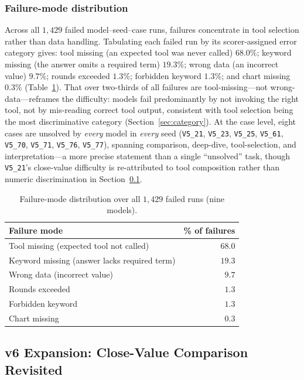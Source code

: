 \documentclass[sigconf]{acmart}
\begin{document}
\subsubsection{Failure-mode distribution}

Across all $1{,}429$ failed model--seed--case runs, failures concentrate in tool selection rather than data handling. Tabulating each failed run by its scorer-assigned error category gives: tool missing (an expected tool was never called) $68.0\%$; keyword missing (the answer omits a required term) $19.3\%$; wrong data (an incorrect value) $9.7\%$; rounds exceeded $1.3\%$; forbidden keyword $1.3\%$; and chart missing $0.3\%$ (Table~\ref{tab:failuremodes}). That over two-thirds of all failures are tool-missing---not wrong-data---reframes the difficulty: models fail predominantly by not invoking the right tool, not by mis-reading correct tool output, consistent with tool selection being the most discriminative category (Section~\ref{sec:category}). At the case level, eight cases are unsolved by \emph{every} model in \emph{every} seed (\texttt{V5\_21}, \texttt{V5\_23}, \texttt{V5\_25}, \texttt{V5\_61}, \texttt{V5\_70}, \texttt{V5\_71}, \texttt{V5\_76}, \texttt{V5\_77}), spanning comparison, deep-dive, tool-selection, and interpretation---a more precise statement than a single ``unsolved'' task, though \texttt{V5\_21}'s close-value difficulty is re-attributed to tool composition rather than numeric discrimination in Section~\ref{sec:v6}.

\begin{table}[ht]
  \centering
  \caption{Failure-mode distribution over all $1{,}429$ failed runs (nine models).}
  \label{tab:failuremodes}
  \small
  \begin{tabular}{@{}lr@{}}
    \toprule
    \textbf{Failure mode} & \textbf{\% of failures} \\
    \midrule
    Tool missing (expected tool not called) & $68.0$ \\
    Keyword missing (answer lacks required term) & $19.3$ \\
    Wrong data (incorrect value) & $9.7$ \\
    Rounds exceeded & $1.3$ \\
    Forbidden keyword & $1.3$ \\
    Chart missing & $0.3$ \\
    \bottomrule
  \end{tabular}
\end{table}

\subsection{v6 Expansion: Close-Value Comparison Revisited}
\label{sec:v6}
\end{document}
